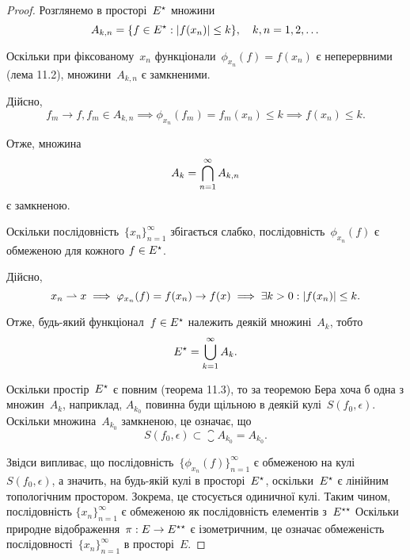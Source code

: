 \begin{proof}
Розглянемо в просторі~$E^\star$ множини
\begin{equation*}
    A_{k,n} = \{f \in E^\star: |f(x_n)| \le k\}, \quad
    k, n = 1, 2, \dots
\end{equation*}

Оскільки при фіксованому~$x_n$ функціонали~$\phi_{x_n}(f) = f(x_n)$ є
неперервними (\error лема 11.2), множини~$A_{k,n}$ є замкненими.

Дійсно,
\begin{equation*}
    f_m \to f, f_m \in A_{k,n} \implies
    \phi_{x_n}(f_m) = f_m(x_n) \le k \implies
    f(x_n) \le k.
\end{equation*}

Отже, множина
\begin{equation*}
    A_k = \operatorname*{\bigcap}_{n = 1}^\infty A_{k,n}
\end{equation*}
є замкненою.

Оскільки послідовність~$\{x_n\}_{n = 1}^\infty$
збігається слабко, послідовність~$\phi_{x_n}(f)$ є обмеженою для кожного
$f \in E^\star$.

Дійсно,
\begin{equation*}
    x_n \rightharpoonup x \implies
    \varphi_{x_n}(f) = f(x_n) \to f(x) \implies
    \exists k > 0: |f(x_n)| \le k.
\end{equation*}

Отже, будь-який функціонал~$f \in E^\star$ належить деякій
множині~$A_k$, тобто
\begin{equation*}
    E^\star = \operatorname*{\bigcup}_{k = 1}^\infty A_k.
\end{equation*}

Оскільки простір~$E^\star$ є повним (теорема 11.3), то за теоремою
Бера хоча б одна з множин~$A_k$, наприклад,
$A_{k_0}$ повинна буди
щільною в деякій кулі~$S(f_0, \epsilon)$. Оскільки множина~$A_{k_0}$
замкненою, це означає, що
\begin{equation*}
    S(f_0, \epsilon) \subset \closure A_{k_0} = A_{k_0}.
\end{equation*}

Звідси випливає, що послідовність~$\{\phi_{x_n}(f)\}_{n = 1}^\infty$
є обмеженою на кулі~$S(f_0, \epsilon)$, а значить, на будь-якій кулі в просторі~$E^\star$,
оскільки~$E^\star$ є лінійним топологічним простором. Зокрема, це
стосується одиничної кулі. Таким чином, послідовність
$\{x_n\}_{n = 1}^\infty$
є обмеженою як послідовність елементів з~$E^{\star\star}$
Оскільки природне відображення~$\pi: E \to E^{\star\star}$ є ізометричним,
це означає обмеженість послідовності~$\{x_n\}_{n = 1}^\infty$ в просторі~$E$.
\end{proof}

